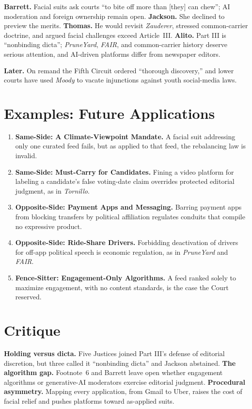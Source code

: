 \documentclass[12pt]{article}
\begin{document}
\textbf{Barrett.} Facial suits ask courts ``to bite off more than [they] can chew''; AI moderation and foreign ownership remain open. \textbf{Jackson.} She declined to preview the merits. \textbf{Thomas.} He would revisit \textit{Zauderer}, stressed common-carrier doctrine, and argued facial challenges exceed Article~III. \textbf{Alito.} Part III is ``nonbinding dicta''; \textit{PruneYard}, \textit{FAIR}, and common-carrier history deserve serious attention, and AI-driven platforms differ from newspaper editors.

\textbf{Later.} On remand the Fifth Circuit ordered ``thorough discovery,'' and lower courts have used \textit{Moody} to vacate injunctions against youth social-media laws.

\section{Examples: Future Applications}

\begin{enumerate}
\item \textbf{Same-Side: A Climate-Viewpoint Mandate.} A facial suit addressing only one curated feed fails, but as applied to that feed, the rebalancing law is invalid.
\item \textbf{Same-Side: Must-Carry for Candidates.} Fining a video platform for labeling a candidate's false voting-date claim overrides protected editorial judgment, as in \textit{Tornillo}.
\item \textbf{Opposite-Side: Payment Apps and Messaging.} Barring payment apps from blocking transfers by political affiliation regulates conduits that compile no expressive product.
\item \textbf{Opposite-Side: Ride-Share Drivers.} Forbidding deactivation of drivers for off-app political speech is economic regulation, as in \textit{PruneYard} and \textit{FAIR}.
\item \textbf{Fence-Sitter: Engagement-Only Algorithms.} A feed ranked solely to maximize engagement, with no content standards, is the case the Court reserved.
\end{enumerate}

\section{Critique}

\textbf{Holding versus dicta.} Five Justices joined Part III's defense of editorial discretion, but three called it ``nonbinding dicta'' and Jackson abstained. \textbf{The algorithm gap.} Footnote~6 and Barrett leave open whether engagement algorithms or generative-AI moderators exercise editorial judgment. \textbf{Procedural asymmetry.} Mapping every application, from Gmail to Uber, raises the cost of facial relief and pushes platforms toward as-applied suits.
\end{document}
